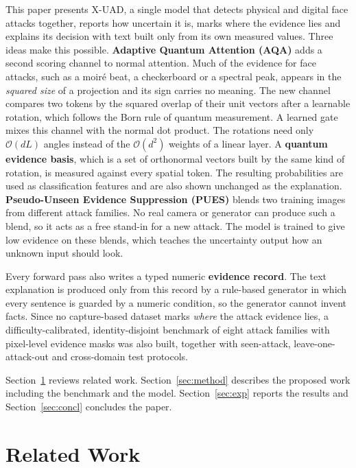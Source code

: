 \documentclass[conference]{IEEEtran}
\begin{document}
This paper presents X-UAD, a single model that detects physical and digital face
attacks together, reports how uncertain it is, marks where the evidence lies and
explains its decision with text built only from its own measured values. Three ideas
make this possible. \textbf{Adaptive Quantum Attention (AQA)} adds a second scoring
channel to normal attention. Much of the evidence for face attacks, such as a moir\'e
beat, a checkerboard or a spectral peak, appears in the \emph{squared size} of a
projection and its sign carries no meaning. The new channel compares two tokens by the
squared overlap of their unit vectors after a learnable rotation, which follows the
Born rule of quantum measurement. A learned gate mixes this channel with the normal
dot product. The rotations need only $\mathcal{O}(dL)$ angles instead of the
$\mathcal{O}(d^{2})$ weights of a linear layer. A \textbf{quantum evidence basis}, which
is a set of orthonormal vectors built by the same kind of rotation, is measured
against every spatial token. The resulting probabilities are used as classification
features and are also shown unchanged as the explanation. \textbf{Pseudo-Unseen
Evidence Suppression (PUES)} blends two training images from different attack
families. No real camera or generator can produce such a blend, so it acts as a free
stand-in for a new attack. The model is trained to give low evidence on these blends,
which teaches the uncertainty output how an unknown input should look.

Every forward pass also writes a typed numeric \textbf{evidence record}. The text
explanation is produced only from this record by a rule-based generator in which every
sentence is guarded by a numeric condition, so the generator cannot invent facts.
Since no capture-based dataset marks \emph{where} the attack evidence lies, a
difficulty-calibrated, identity-disjoint benchmark of eight attack families with
pixel-level evidence masks was also built, together with seen-attack,
leave-one-attack-out and cross-domain test protocols.

Section~\ref{sec:related} reviews related work. Section~\ref{sec:method} describes the
proposed work including the benchmark and the model. Section~\ref{sec:exp} reports the
results and Section~\ref{sec:concl} concludes the paper.

\section{Related Work}\label{sec:related}
\end{document}
